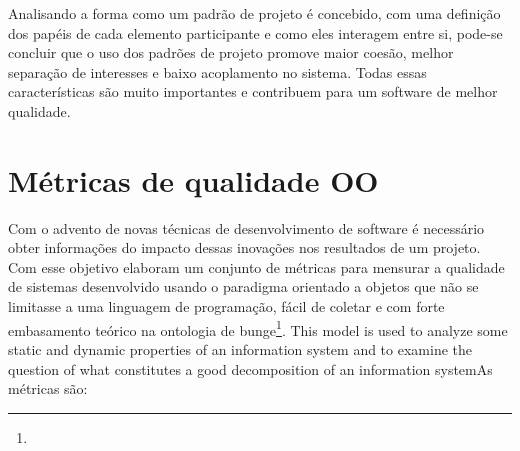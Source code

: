 Analisando a forma como um padrão de projeto é concebido, com uma definição
dos papéis de cada elemento participante e como eles interagem entre si,
pode-se concluir que o uso dos padrões de projeto promove maior coesão, melhor
separação de interesses e baixo acoplamento no sistema. Todas essas
características são muito importantes e contribuem para um software de melhor
qualidade.




\section{Métricas de qualidade OO}
\label{sec:metrics}

Com o advento de novas técnicas de desenvolvimento de software é necessário
obter informações do impacto dessas inovações nos resultados de um projeto. Com
esse objetivo  elaboram um conjunto de métricas para
mensurar a qualidade de sistemas desenvolvido usando o paradigma orientado a objetos que
não se limitasse a uma linguagem de programação, fácil de coletar e com forte
embasamento teórico na ontologia de bunge\footnote{}. This model is used to analyze
some static and dynamic properties of an information system and to examine the
question of what constitutes a good decomposition of an information
system\cite{WandWeber}As métricas são:




